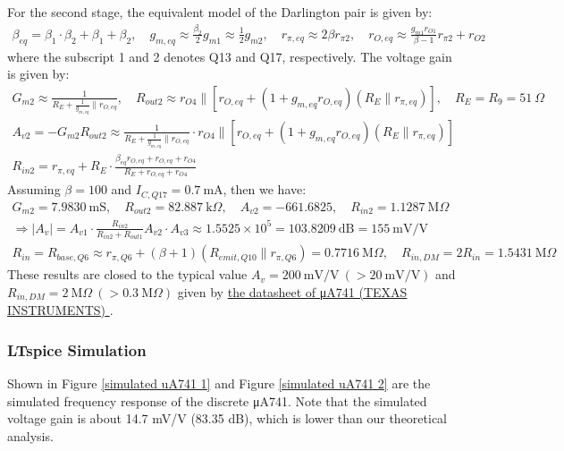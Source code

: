 \documentclass[UTF8]{article}
\begin{document}
\noindent 
For the second stage, the equivalent model of the Darlington pair is given by:
\begin{gather}
\beta_{eq} = \beta_1 \cdot \beta_2 + \beta_1 + \beta_2,\quad 
g_{m,eq} \approx \frac{\beta_2}{2}g_{m1} \approx \frac{1}{2}g_{m2},\quad 
r_{\pi,eq} \approx 2 \beta r_{\pi 2},\quad 
r_{O,eq} \approx \frac{g_{m1}r_{O1}}{\beta - 1}r_{\pi 2} + r_{O2}
\end{gather}
where the subscript 1 and 2 denotes Q13 and Q17, respectively. The voltage gain is given by:
\begin{gather}
G_{m2} \approx \frac{1}{R_E + \frac{1}{g_{m,eq}} \parallel r_{O,eq}},\quad 
R_{out2} \approx r_{O4} \parallel \left[r_{O,eq} + (1 + g_{m,eq}r_{O,eq})(R_E \parallel r_{\pi,eq})\right],\quad 
R_E = R_9 = 51\ \Omega
\\ A_{v2} = - G_{m2}R_{out2} \approx \frac{1}{R_E + \frac{1}{g_{m,eq}} \parallel r_{O,eq}} \cdot r_{O4} \parallel \left[r_{O,eq} + (1 + g_{m,eq}r_{O,eq})(R_E \parallel r_{\pi,eq})\right]
\\ 
R_{in2} = r_{\pi,eq} + R_E \cdot \frac{\beta_{eq}r_{O,eq} + r_{O,eq} + r_{O4}}{R_E + r_{O,eq} + r_{O4}}
\end{gather}
Assuming $\beta = 100$ and $I_{C,Q17} = 0.7 \ \mathrm{mA}$, then we have:
\begin{gather}
G_{m2} = 7.9830 \ \mathrm{mS},\quad R_{out2} = 82.887 \ \mathrm{k}\Omega,\quad A_{v2} = - 661.6825,\quad R_{in2} = 1.1287 \ \mathrm{M}\Omega
\\ 
\Longrightarrow 
|A_v| = A_{v1}\cdot \frac{R_{in2}}{R_{in2} + R_{out1}}A_{v2} \cdot A_{v3} \approx 1.5525 \times 10^5 = 103.8209 \ \mathrm{dB} = 155 \ \mathrm{mV/V}
\\ 
R_{in} = R_{base,Q6} \approx r_{\pi,Q6} + (\beta + 1)(R_{emit,Q10} \parallel r_{\pi, Q6}) = 0.7716 \ \mathrm{M}\Omega,\quad 
R_{in,DM} = 2 R_{in} = 1.5431 \ \mathrm{M}\Omega
\end{gather}
These results are closed to the typical value $A_v = 200\ \mathrm{mV/V}\ (> 20 \ \mathrm{mV/V})$ and $R_{in,DM} = 2 \ \mathrm{M}\Omega\ (> 0.3 \ \mathrm{M}\Omega)$ given by %
\href{https://www.ti.com/cn/lit/ds/symlink/ua741.pdf
}{ %
the datasheet of μA741 (TEXAS INSTRUMENTS)
}.

\subsubsection{LTspice Simulation}

Shown in Figure \ref{simulated uA741 1} and Figure \ref{simulated uA741 2} are the simulated frequency response of the discrete μA741. Note that the simulated voltage gain is about 14.7 mV/V (83.35 dB), which is lower than our theoretical analysis.
\end{document}
